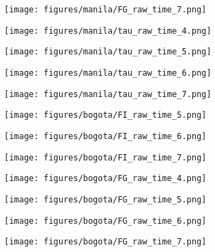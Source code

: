 \documentclass[a4paper]{article}
\def\lthtmlcheckvsize{\ifdim\ht\sizebox<\vsize 
  \ifdim\wd\sizebox<\hsize\expandafter\hfill\fi \expandafter\vfill
  \else\expandafter\vss\fi}%
\begin{document}
{\newpage\clearpage
{}%
\texttt{[image: figures/manila/FG\_raw\_time\_7.png]}%
\lthtmlpictureZ
\lthtmlcheckvsize\clearpage}

{\newpage\clearpage
{}%
\texttt{[image: figures/manila/tau\_raw\_time\_4.png]}%
\lthtmlpictureZ
\lthtmlcheckvsize\clearpage}

{\newpage\clearpage
{}%
\texttt{[image: figures/manila/tau\_raw\_time\_5.png]}%
\lthtmlpictureZ
\lthtmlcheckvsize\clearpage}

{\newpage\clearpage
{}%
\texttt{[image: figures/manila/tau\_raw\_time\_6.png]}%
\lthtmlpictureZ
\lthtmlcheckvsize\clearpage}

{\newpage\clearpage
{}%
\texttt{[image: figures/manila/tau\_raw\_time\_7.png]}%
\lthtmlpictureZ
\lthtmlcheckvsize\clearpage}

{\newpage\clearpage
{}%
\texttt{[image: figures/bogota/FI\_raw\_time\_5.png]}%
\lthtmlpictureZ
\lthtmlcheckvsize\clearpage}

{\newpage\clearpage
{}%
\texttt{[image: figures/bogota/FI\_raw\_time\_6.png]}%
\lthtmlpictureZ
\lthtmlcheckvsize\clearpage}

{\newpage\clearpage
{}%
\texttt{[image: figures/bogota/FI\_raw\_time\_7.png]}%
\lthtmlpictureZ
\lthtmlcheckvsize\clearpage}

{\newpage\clearpage
{}%
\texttt{[image: figures/bogota/FG\_raw\_time\_4.png]}%
\lthtmlpictureZ
\lthtmlcheckvsize\clearpage}

{\newpage\clearpage
{}%
\texttt{[image: figures/bogota/FG\_raw\_time\_5.png]}%
\lthtmlpictureZ
\lthtmlcheckvsize\clearpage}

{\newpage\clearpage
{}%
\texttt{[image: figures/bogota/FG\_raw\_time\_6.png]}%
\lthtmlpictureZ
\lthtmlcheckvsize\clearpage}

{\newpage\clearpage
{}%
\texttt{[image: figures/bogota/FG\_raw\_time\_7.png]}%
\lthtmlpictureZ
\lthtmlcheckvsize\clearpage}
\end{document}
